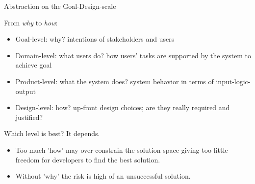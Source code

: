\begin{Slide}{Abstraction on the Goal-Design-scale}

From \textit{why} to \textit{how}:
\begin{itemize}
\item Goal-level: why? intentions of stakeholders and users
\item Domain-level: what users do? how users' tasks are supported by the system to achieve goal
\item Product-level: what the system does? system behavior in terms of input-logic-output
\item Design-level: how? up-front design choices; are they really required and justified?  

\end{itemize}
Which level is best? It depends.
\begin{itemize}
\item Too much 'how' may over-constrain the solution space giving too little freedom for developers to find the best solution.  
\item Without 'why' the risk is high of an unsuccessful solution.

\end{itemize}
\end{Slide}